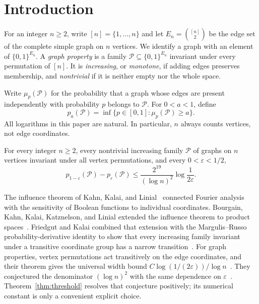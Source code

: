 \section{Introduction}
\label{sec:introduction}

For an integer $n\ge2$, write $[n]=\{1,\ldots,n\}$ and let $E_n=\binom{[n]}2$ be the edge set of the complete simple graph on $n$ vertices. We identify a graph with an element of $\{0,1\}^{E_n}$. A \emph{graph property} is a family $\mathcal P\subseteq\{0,1\}^{E_n}$ invariant under every permutation of $[n]$. It is \emph{increasing}, or \emph{monotone}, if adding edges preserves membership, and \emph{nontrivial} if it is neither empty nor the whole space.

Write $\mu_p(\mathcal P)$ for the probability that a graph whose edges are present independently with probability $p$ belongs to $\mathcal P$. For $0<a<1$, define
\[
 p_a(\mathcal P)=\inf\{p\in[0,1]:\mu_p(\mathcal P)\ge a\}.
\]
All logarithms in this paper are natural. In particular, $n$ always counts vertices, not edge coordinates.

\begin{theorem}
\label{thm:threshold}
For every integer $n\ge2$, every nontrivial increasing family $\mathcal P$ of graphs on $n$ vertices invariant under all vertex permutations, and every $0<\varepsilon<1/2$,
\begin{equation}
\label{eq:threshold}
 p_{1-\varepsilon}(\mathcal P)-p_\varepsilon(\mathcal P)
 \le \frac{2^{19}}{(\log n)^2}\log\frac1{2\varepsilon}.
\end{equation}
\end{theorem}

The influence theorem of Kahn, Kalai, and Linial~\cite{KKL88}
connected Fourier analysis with the sensitivity of Boolean functions
to individual coordinates. Bourgain, Kahn, Kalai, Katznelson, and
Linial extended the influence theorem to product
spaces~\cite{BKKKL92}. Friedgut and Kalai combined that extension
with the Margulis--Russo probability-derivative identity to show that
every increasing family invariant under a transitive coordinate group
has a narrow transition~\cite[Section~2]{FK96}. For graph properties,
vertex permutations act transitively on the edge coordinates, and their
theorem gives the universal width bound
$C\log(1/(2\varepsilon))/\log n$~\cite[Theorem~1.1]{FK96}.
They conjectured the denominator $(\log n)^2$ with the same dependence
on $\varepsilon$~\cite[Conjecture~1.2]{FK96}.
Theorem~\ref{thm:threshold} resolves that conjecture positively;
its numerical constant is only a convenient explicit choice.


